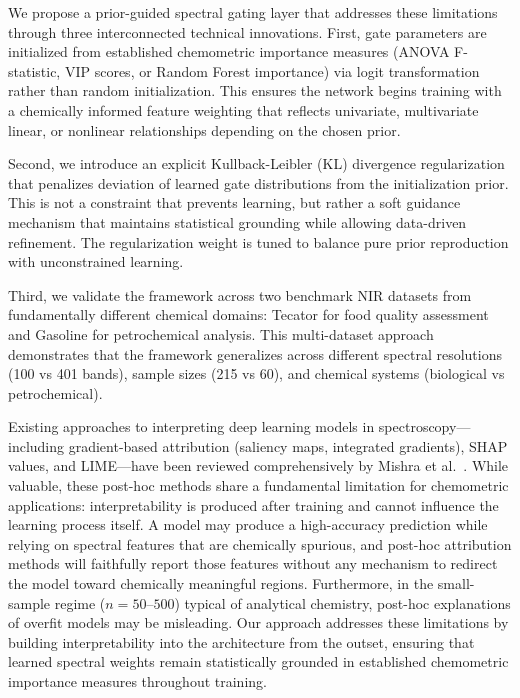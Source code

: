 \documentclass[preprint,12pt]{elsarticle}
\begin{document}
We propose a prior-guided spectral gating layer that addresses these limitations through three interconnected technical innovations. First, gate parameters are initialized from established chemometric importance measures (ANOVA F-statistic, VIP scores, or Random Forest importance) via logit transformation rather than random initialization. This ensures the network begins training with a chemically informed feature weighting that reflects univariate, multivariate linear, or nonlinear relationships depending on the chosen prior.

Second, we introduce an explicit Kullback-Leibler (KL) divergence regularization that penalizes deviation of learned gate distributions from the initialization prior. This is not a constraint that prevents learning, but rather a soft guidance mechanism that maintains statistical grounding while allowing data-driven refinement. The regularization weight is tuned to balance pure prior reproduction with unconstrained learning.

Third, we validate the framework across two benchmark NIR datasets from fundamentally different chemical domains: Tecator for food quality assessment and Gasoline for petrochemical analysis. This multi-dataset approach demonstrates that the framework generalizes across different spectral resolutions (100 vs 401 bands), sample sizes (215 vs 60), and chemical systems (biological vs petrochemical).

Existing approaches to interpreting deep learning models in spectroscopy---including gradient-based attribution (saliency maps, integrated gradients), SHAP values, and LIME---have been reviewed comprehensively by Mishra et al.~\cite{mishra2021trends}. While valuable, these post-hoc methods share a fundamental limitation for chemometric applications: interpretability is produced after training and cannot influence the learning process itself. A model may produce a high-accuracy prediction while relying on spectral features that are chemically spurious, and post-hoc attribution methods will faithfully report those features without any mechanism to redirect the model toward chemically meaningful regions. Furthermore, in the small-sample regime ($n=50$--$500$) typical of analytical chemistry, post-hoc explanations of overfit models may be misleading. Our approach addresses these limitations by building interpretability into the architecture from the outset, ensuring that learned spectral weights remain statistically grounded in established chemometric importance measures throughout training.
\end{document}
